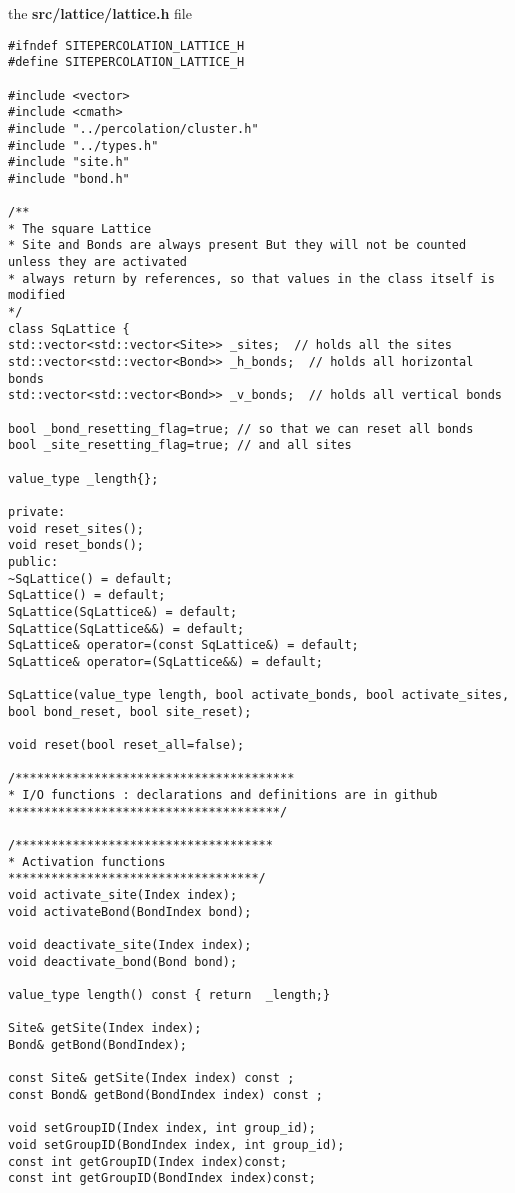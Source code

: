 
the \textbf{src/lattice/lattice.h} file
\begin{lstlisting}[style=CStyle]
#ifndef SITEPERCOLATION_LATTICE_H
#define SITEPERCOLATION_LATTICE_H

#include <vector>
#include <cmath>
#include "../percolation/cluster.h"
#include "../types.h"
#include "site.h"
#include "bond.h"

/**
* The square Lattice
* Site and Bonds are always present But they will not be counted unless they are activated
* always return by references, so that values in the class itself is modified
*/
class SqLattice {
std::vector<std::vector<Site>> _sites;  // holds all the sites
std::vector<std::vector<Bond>> _h_bonds;  // holds all horizontal bonds
std::vector<std::vector<Bond>> _v_bonds;  // holds all vertical bonds

bool _bond_resetting_flag=true; // so that we can reset all bonds
bool _site_resetting_flag=true; // and all sites

value_type _length{};

private:
void reset_sites();
void reset_bonds();
public:
~SqLattice() = default;
SqLattice() = default;
SqLattice(SqLattice&) = default;
SqLattice(SqLattice&&) = default;
SqLattice& operator=(const SqLattice&) = default;
SqLattice& operator=(SqLattice&&) = default;

SqLattice(value_type length, bool activate_bonds, bool activate_sites, bool bond_reset, bool site_reset);

void reset(bool reset_all=false);

/***************************************
* I/O functions : declarations and definitions are in github
**************************************/

/************************************
* Activation functions
***********************************/
void activate_site(Index index);
void activateBond(BondIndex bond);

void deactivate_site(Index index);
void deactivate_bond(Bond bond);

value_type length() const { return  _length;}

Site& getSite(Index index);
Bond& getBond(BondIndex);

const Site& getSite(Index index) const ;
const Bond& getBond(BondIndex index) const ;

void setGroupID(Index index, int group_id);
void setGroupID(BondIndex index, int group_id);
const int getGroupID(Index index)const;
const int getGroupID(BondIndex index)const;


\end{lstlisting}

